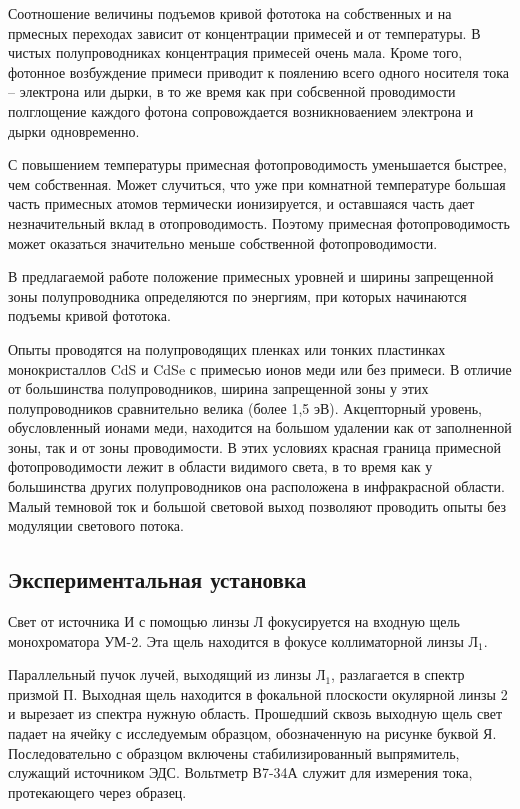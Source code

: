 \documentclass[a4paper, 12pt]{article}
\begin{document}
	Соотношение величины подъемов кривой фототока на собственных и на прмесных переходах зависит от концентрации примесей и от температуры. В чистых полупроводниках концентрация примесей очень мала. Кроме того, фотонное возбуждение примеси приводит к поялению всего одного носителя тока -- электрона или дырки, в то же время как при собсвенной проводимости полглощение каждого фотона сопровождается возникноваением электрона и дырки одновременно.

	С повышением температуры примесная фотопроводимость уменьшается быстрее, чем собственная. Может случиться, что уже при комнатной температуре большая часть примесных атомов термически ионизируется, и оставшаяся часть дает незначительный вклад в отопроводимость. Поэтому примесная фотопроводимость может оказаться значительно меньше собственной фотопроводимости.

	В предлагаемой работе положение примесных уровней и ширины запрещенной зоны полупроводника определяются по энергиям, при которых начинаются подъемы кривой фототока.

	Опыты проводятся на полупроводящих пленках или тонких пластинках монокристаллов CdS и CdSe с примесью ионов меди или без примеси. В отличие от большинства полупроводников, ширина запрещенной зоны у этих полупроводников сравнительно велика (более 1,5 эВ). Акцепторный уровень, обусловленный ионами меди, находится на большом удалении как от заполненной зоны, так и от зоны проводимости. В этих условиях красная граница примесной фотопроводимости лежит в области видимого света, в то время как у большинства других полупроводников она расположена в инфракрасной  области. Малый темновой ток и большой световой выход позволяют проводить опыты без модуляции светового потока.

	\subsection{Экспериментальная установка}
	Свет от источника И с помощью линзы Л фокусируется на входную щель монохроматора УМ-2. Эта щель находится в фокусе коллиматорной линзы $\text{Л}_1$.

	Параллельный пучок лучей, выходящий из линзы $\text{Л}_1$, разлагается в спектр призмой П. Выходная щель находится в фокальной плоскости окулярной линзы 2 и вырезает из спектра нужную область. Прошедший сквозь выходную щель свет падает на ячейку с исследуемым образцом, обозначенную на рисунке буквой Я. Последовательно с образцом включены стабилизированный выпрямитель, служащий источником ЭДС. Вольтметр В7-34А служит для измерения тока, протекающего через образец.
\end{document}
